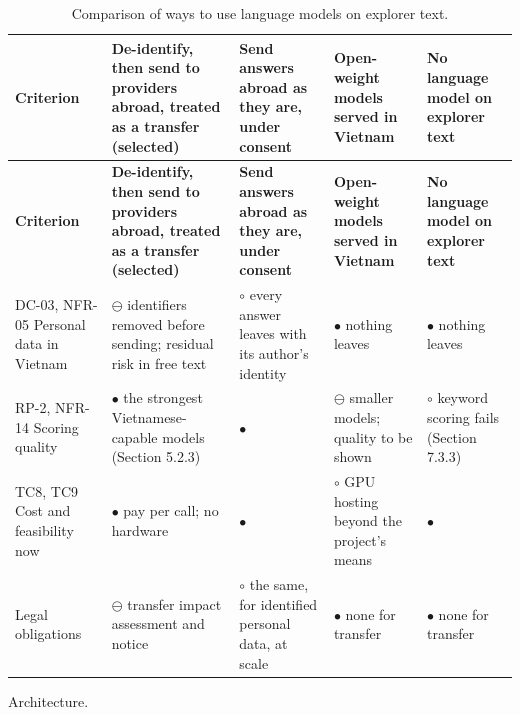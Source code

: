 {\small
\begin{longtable}{|>{\raggedright\arraybackslash}p{}|>{\raggedright\arraybackslash}p{}|>{\raggedright\arraybackslash}p{}|>{\raggedright\arraybackslash}p{}|>{\raggedright\arraybackslash}p{}|}
\caption{Comparison of ways to use language models on explorer text.} \\
\hline
\textbf{Criterion} & \textbf{De-\allowbreak{}identify, then send to providers abroad, treated as a transfer (selected)} & \textbf{Send answers abroad as they are, under consent} & \textbf{Open-weight models served in Vietnam} & \textbf{No language model on explorer text} \\ \hline
\endfirsthead
\hline
\textbf{Criterion} & \textbf{De-\allowbreak{}identify, then send to providers abroad, treated as a transfer (selected)} & \textbf{Send answers abroad as they are, under consent} & \textbf{Open-weight models served in Vietnam} & \textbf{No language model on explorer text} \\ \hline
\endhead
DC-03, NFR-05 Personal data in Vietnam & $\ominus$ identifiers removed before sending; residual risk in free text & $\circ$ every answer leaves with its author's identity & $\bullet$ nothing leaves & $\bullet$ nothing leaves \\ \hline
RP-2, NFR-14 Scoring quality & $\bullet$ the strongest Vietnamese-\allowbreak{}capable models (Section 5.2.3) & $\bullet$ & $\ominus$ smaller models; quality to be shown & $\circ$ keyword scoring fails (Section 7.3.3) \\ \hline
TC8, TC9 Cost and feasibility now & $\bullet$ pay per call; no hardware & $\bullet$ & $\circ$ GPU hosting beyond the project's means & $\bullet$ \\ \hline
Legal obligations & $\ominus$ transfer impact assessment and notice & $\circ$ the same, for identified personal data, at scale & $\bullet$ none for transfer & $\bullet$ none for transfer \\ \hline
\end{longtable}
}

Architecture.

